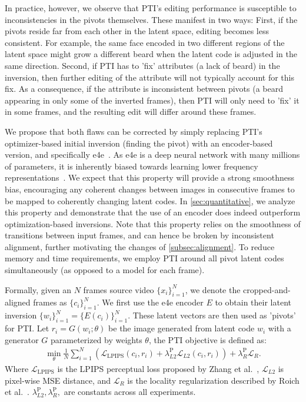 In practice, however, we observe that PTI's editing performance is susceptible to inconsistencies in the pivots themselves. These manifest in two ways: First, if the pivots reside far from each other in the latent space, editing becomes less consistent. For example, the same face encoded in two different regions of the latent space might grow a different beard when the latent code is adjusted in the same direction. Second, if PTI has to 'fix' attributes (\eg a lack of beard) in the inversion, then further editing of the attribute will not typically account for this fix. As a consequence, if the attribute is inconsistent between pivots (a beard appearing in only some of the inverted frames), then PTI will only need to 'fix' it in some frames, and the resulting edit will differ around these frames.

We propose that both flaws can be corrected by simply replacing PTI's optimizer-based initial inversion (\ie finding the pivot) with an encoder-based version, and specifically e4e~\cite{tov2021designing}. As e4e is a deep neural network with many millions of parameters, it is inherently biased towards learning lower frequency representations~\cite{rahaman2019spectral}. We expect that this property will provide a strong smoothness bias, encouraging any coherent changes between images in consecutive frames to be mapped to coherently changing latent codes. In \cref{sec:quantitative}, we analyze this property and demonstrate that the use of an encoder does indeed outperform optimization-based inversions. Note that this property relies on the smoothness of transitions between input frames, and can hence be broken by inconsistent alignment, further motivating the changes of \cref{subsec:alignment}. To reduce memory and time requirements, we employ PTI around all pivot latent codes simultaneously (as opposed to a model for each frame).


Formally, given an $N$ frames source video $\{x_i\}^N_{i=1}$, we denote the cropped-and-aligned frames as $\{c_i\}^N_{i=1}$. We first use the e4e encoder $E$ to obtain their latent inversion $\{w_i\}^N_{i=1} = \{E(c_i)\}^N_{i=1}$. These latent vectors are then used as 'pivots' for PTI. Let $r_i = G(w_i; \theta)$ be the image generated from latent code $w_i$ with a generator $G$ parameterized by weights $\theta$, the PTI objective is defined as:
\begin{align}
\underset{\theta}{\min} \frac{1}{N}\sum^{N}_{i=1} ( \mathcal{L}_{\text{LPIPS}}(c_i, r_i) + \lambda^{\text{P}}_{L2}\mathcal{L}_{L2}(c_i, r_i)) + \lambda^{\text{P}}_R \mathcal{L}_{R}.
\end{align}
Where $\mathcal{L}_{\text{LPIPS}}$ is the LPIPS perceptual loss proposed by Zhang et al.~, $\mathcal{L}_{L2}$ is pixel-wise MSE distance, and $\mathcal{L}_{R}$ is the locality regularization described by Roich et al.~. $\lambda^{\text{P}}_{L2}, \lambda^{\text{P}}_R, $ are constants across all experiments.


